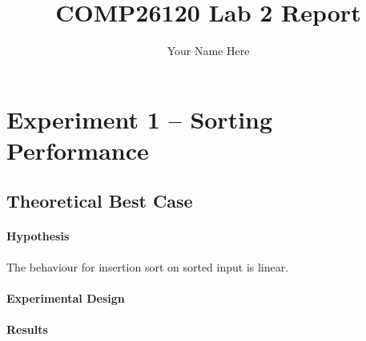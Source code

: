\documentclass[a4]{article}
\title{COMP26120 Lab 2 Report}
\author{Your Name Here}
\begin{document}
\maketitle

\section{Experiment 1 -- Sorting Performance}

\subsection{Theoretical Best Case}

\paragraph{Hypothesis} The behaviour for insertion sort on sorted input is linear. 


\paragraph{Experimental Design} 








\paragraph{Results} 



\end{document}
